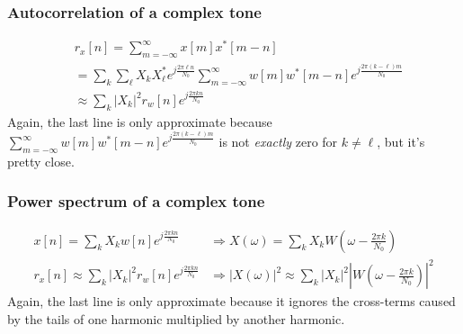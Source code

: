 \documentclass{beamer}
\begin{document}
\begin{frame}
  \frametitle{Autocorrelation of a complex tone}

  \begin{align*}
    &r_x[n] = \sum_{m=-\infty}^\infty x[m]x^*[m-n]\\
    &= \sum_{k}\sum_{\ell}X_kX_\ell^*e^{j\frac{2\pi\ell n}{N_0}}
    \sum_{m=-\infty}^\infty w[m]w^*[m-n]e^{j\frac{2\pi(k-\ell)m}{N_0}}\\
    &\approx \sum_{k}|X_k|^2r_w[n]e^{j\frac{2\pi k n}{N_0}}
  \end{align*}
  Again, the last line is only approximate because
  $\sum_{m=-\infty}^\infty w[m]w^*[m-n]e^{j\frac{2\pi(k-\ell)m}{N_0}}$
  is not \textit{exactly} zero for $k\ne\ell$, but it's pretty close.
\end{frame}

\begin{frame}
  \frametitle{Power spectrum of a complex tone}

  \begin{align*}
    x[n]=\sum_{k}X_k w[n]e^{j\frac{2\pi kn}{N_0}}
    &\Rightarrow X(\omega)=\sum_{k}X_kW\left(\omega-\frac{2\pi k}{N_0}\right)\\
    r_x[n]\approx\sum_{k}|X_k|^2 r_w[n]e^{j\frac{2\pi kn}{N_0}}
    &\Rightarrow |X(\omega)|^2
    \approx\sum_{k}|X_k|^2\left\vert W\left(\omega-\frac{2\pi k}{N_0}\right)\right\vert^2
  \end{align*}
  Again, the last line is only approximate because it ignores
  the cross-terms caused by the tails of one harmonic multiplied by another harmonic.
\end{frame}
\end{document}

